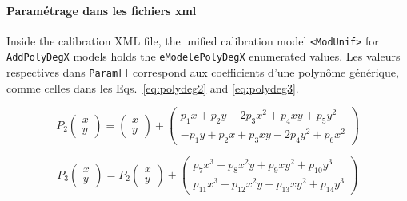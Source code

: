 \documentclass[11pt,a4paper,oneside]{book}
\makeatletter
\newcommand\footnoteref[1]{\protected@xdef\@thefnmark{\ref{#1}}\@footnotemark}
\makeatother
\begin{document}
\paragraph{Paramétrage dans les fichiers xml}
%
Inside the calibration XML file, the unified calibration model {\tt <ModUnif>} for {\tt AddPolyDegX} models holds the  {\tt eModelePolyDegX} enumerated values\footnoteref{fn:unif}. Les valeurs respectives dans {\tt Param[]} correspond aux coefficients d'une polynôme générique, comme celles dans les Eqs.~\eqref{eq:polydeg2} and \eqref{eq:polydeg3}.


\begin{equation}
   P_2 \begin{pmatrix}  x \\  y  \end{pmatrix}
   = \begin{pmatrix}  x \\  y  \end{pmatrix}
     + \begin{pmatrix}  p_1 x  + p_2 y -2 p_3 x^2  + p_4 xy + p_5 y^2
                     \\ -p_1y + p_2 x  + p_3 xy - 2 p_4 y^2 + p_6 x^2 \end{pmatrix} \label{eq:polydeg2}
\end{equation}


\begin{equation}
   P_3 \begin{pmatrix}  x \\  y  \end{pmatrix}
   = P_2 \begin{pmatrix}  x \\  y  \end{pmatrix}
     +    \begin{pmatrix}  p_7 x^3 + p_8 x^2y + p_9 xy^2 + p_{10} y^3
                        \\  p_{11} x^3 + p_{12} x^2y + p_{13} xy^2 + p_{14} y^3   \end{pmatrix} \label{eq:polydeg3}
\end{equation}
\end{document}
